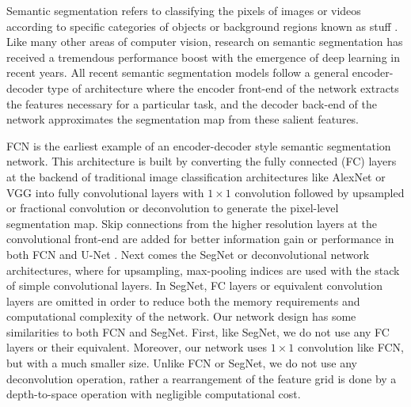 \documentclass[10pt,twocolumn,letterpaper]{article}
\begin{document}
Semantic segmentation refers to classifying the pixels of images or videos according to specific categories of objects or background regions known as stuff \cite{coco-stuff}. Like many other areas of computer vision, research on semantic segmentation has received a tremendous performance boost with the emergence of deep learning in recent years. All recent semantic segmentation models follow a general encoder-decoder type of architecture where the encoder front-end of the network extracts the features necessary for a particular task, and the decoder back-end of the network approximates the segmentation map from these salient features.

FCN \cite{fcn} is the earliest example of an encoder-decoder style semantic segmentation network. This architecture is built by converting the fully connected (FC) layers at the backend of traditional image classification architectures like AlexNet \cite{alexnet} or VGG \cite{vgg} into fully convolutional layers with $1\times 1$ convolution followed by upsampled or fractional convolution or deconvolution to generate the pixel-level segmentation map. Skip connections from the higher resolution layers at the convolutional front-end are added for better information gain or performance in both FCN and U-Net \cite{u-net}. Next comes the SegNet \cite{segnet} or deconvolutional network \cite{deconv} architectures, where for upsampling, max-pooling indices are used with the stack of simple convolutional layers. In SegNet, FC layers or equivalent convolution layers are omitted in order to reduce both the memory requirements and computational complexity of the network. Our network design has some similarities to both FCN and SegNet. First, like SegNet, we do not use any FC layers or their equivalent. Moreover, our network uses $1\times 1$ convolution like FCN, but with a much smaller size. Unlike FCN or SegNet, we do not use any deconvolution operation, rather a rearrangement of the feature grid is done by a depth-to-space operation with negligible computational cost.
\end{document}
